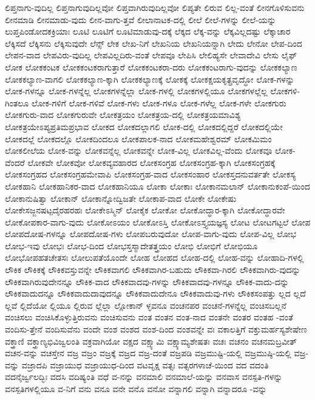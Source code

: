 {ಲಿಪ್ತನಾಗು-ವುದಿಲ್ಲ
ಲಿಪ್ತನಾಗುವುದಿಲ್ಲವೋ
ಲಿಪ್ತವಾಗಿರುವುದಿಲ್ಲವೋ
ಲಿಪ್ಯತೇ
ಲಿರುವ
ಲಿಲ್ಲ-ವಂತೆ
ಲೀನಗೊಳಿಸುವನು
ಲೀನಮಾಡಿ
ಲೀನಮಾಡು-ವುದು
ಲೀನ-ವಾಗು-ತ್ತವೆ
ಲೀಲಾನಾಟಕ-ದಲ್ಲಿ
ಲೀಲೆ
ಲೀಲೆ-ಗಳನ್ನು
ಲೀಲೆ-ಯನ್ನು
ಲುಪ್ತಪಿಂಡೋದಕಕ್ರಿಯಾಃ
ಲೂಟಿ
ಲೂಟಿಗೆ
ಲೂಟಿಮಾಡುವು-ದಕ್ಕೆ
ಲೆಕ್ಕದ
ಲೆಕ್ಕ-ವನ್ನು
ಲೆಕ್ಕವಿಲ್ಲದಷ್ಟು
ಲೆಕ್ಕಾಚಾರ
ಲೆಕ್ಕಿಸದೆ
ಲೆಕ್ಕಿಸನು
ಲೆಕ್ಕಿಸುವುದೇ
ಲೆನ್ಸ್
ಲೇಕ
ಲೇಖ-ನಿಗೆ
ಲೇಖನಿಯ
ಲೇಖನಿಯನ್ನಾಗಿ
ಲೇದು
ಲೇನೋ
ಲೇಪ-ದಿಂದ
ಲೇಪನ-ವಾದ
ಲೇಪವಿರು-ವುದಿಲ್ಲ
ಲೇಪವಿಲ್ಲದಿರು-ವಂತೆ
ಲೇಪವೂ
ಲೇಪಿಸಿ
ಲೇಲಿಹ್ಯಸೇ
ಲೇವಾದೇವಿ
ಲೇಸು
ಲೈಫ್
ಲೋಕ
ಲೋಕಕಂಟಕ
ಲೋಕಕಂಟಕರಾಗುತ್ತಾರೆ
ಲೋಕಕಂಟಕರಾ-ದರು
ಲೋಕಕಂಟರಾಗು-ವುದನ್ನು
ಲೋಕಕಲ್ಯಾಣ
ಲೋಕಕಲ್ಯಾಣ-ವಾಗಲಿ
ಲೋಕಕಲ್ಯಾಣ-ಕ್ಕಾಗಿ
ಲೋಕಕಲ್ಯಾಣಕ್ಕೆ
ಲೋಕಕ್ಕೆ
ಲೋಕಕ್ಷಯಕೃತ್ಪ್ರವೃದ್ಧೋ
ಲೋಕ-ಗಳನ್ನು
ಲೋಕ-ಗಳನ್ನೂ
ಲೋಕ-ಗಳನ್ನೆಲ್ಲ
ಲೋಕಗಳನ್ನೆಲ್ಲಾ
ಲೋಕ-ಗಳಲ್ಲಿ
ಲೋಕಗಳಲ್ಲಿಯೂ
ಲೋಕಗಳಲ್ಲೆಲ್ಲ
ಲೋಕಗಳಿ-ಗಿಂತಲೂ
ಲೋಕ-ಗಳಿಗೆ
ಲೋಕ-ಗಳಿವೆ
ಲೋಕ-ಗಳು
ಲೋಕ-ಗಳೂ
ಲೋಕ-ಗಳೆಲ್ಲ
ಲೋಕ-ಗಳೇ
ಲೋಕಗುರು
ಲೋಕಗುರು-ವಾದ
ಲೋಕಗುರುವೇ
ಲೋಕತ್ರಯಂ
ಲೋಕತ್ರಯ-ದಲ್ಲಿ
ಲೋಕತ್ರಯಮಾವಿಶ್ಯ
ಲೋಕತ್ರಯೇಽಪ್ಯಪ್ರತಿಮಪ್ರಭಾವ
ಲೋಕದ
ಲೋಕದಲ್ಲಾಗಲಿ
ಲೋಕ-ದಲ್ಲಿ
ಲೋಕದಲ್ಲಿದ್ದರೆ
ಲೋಕದಲ್ಲಿಯೇ
ಲೋಕದಲ್ಲೆ
ಲೋಕದಲ್ಲೊ
ಲೋಕದಿಂದಲೂ
ಲೋಕಪಾಲಕ-ನಾದ
ಲೋಕಮಹೇಶ್ವರಮ್
ಲೋಕಮಿಮಂ
ಲೋಕಲೀಲೆಯ
ಲೋಕ-ವನ್ನು
ಲೋಕವನ್ನೆಲ್ಲ
ಲೋಕವನ್ನೇ
ಲೋಕ-ವಿಲ್ಲ
ಲೋಕವಿಲ್ಲ-ವೆಂದು
ಲೋಕವೂ
ಲೋಕ-ವೆಂದರೆ
ಲೋಕವೇ
ಲೋಕವೋ
ಲೋಕವ್ಯವಹಾರದ
ಲೋಕಸಂಗ್ರಹ
ಲೋಕಸಂಗ್ರಹ-ಕ್ಕಾಗಿ
ಲೋಕಸಂಗ್ರಹಕ್ಕೆ
ಲೋಕಸಂಗ್ರಹದ
ಲೋಕಸಂಗ್ರಹಮೇವಾಪಿ
ಲೋಕಸಂಗ್ರಹ-ವಾದ
ಲೋಕಸಂಹಾರ
ಲೋಕಸ್ತದನುವರ್ತತೇ
ಲೋಕಸ್ಯ
ಲೋಕಹಾನಿ
ಲೋಕಹಾನಿಕರ-ವಾದ
ಲೋಕಹಾನಿಯೂ
ಲೋಕಾ
ಲೋಕಾಃ
ಲೋಕಾನಮಲಾನ್
ಲೋಕಾನುಕಂಪೆ-ಯಿಂದ
ಲೋಕಾನುಷಿತ್ವಾ
ಲೋಕಾನ್
ಲೋಕಾನ್ನೋದ್ವಿಜತೇ
ಲೋಕಾಪ-ವಾದ
ಲೋಕೇ
ಲೋಕೇಷು
ಲೋಕೇಸಜ್ಜನಷಟ್ಪದೈರಹರಹಃ
ಲೋಕೇಽಸ್ಮಿನ್
ಲೋಕೈಕ
ಲೋಕೋ
ಲೋಕೋದ್ಧಾರ-ಕ್ಕಾಗಿ
ಲೋಕೋದ್ಧಾರವೇ
ಲೋಕೋಪಕಾರ-ವಾಗು-ವುದು
ಲೋಕೋಽಯಂ
ಲೋಕೋಽಸ್ತಿ
ಲೋಕೋಽಸ್ತ್ಯಯಜ್ಞಸ್ಯ
ಲೋಟ
ಲೋಟಗಟ್ಟಲೆ
ಲೋಪ
ಲೋಪದೋಷ-ಗಳನ್ನೂ
ಲೋಪದೋಷ-ಗಳು
ಲೋಪಬರುವುದೋ
ಲೋಪ-ವಾಗು-ವುದು
ಲೋಪ-ವಿಲ್ಲ
ಲೋಭ
ಲೋಭ-ಇವು
ಲೋಭಃ
ಲೋಭ-ದಿಂದ
ಲೋಭಸ್ತಸ್ಮಾದೇತತ್ತ್ರಯಂ
ಲೋಭಿ
ಲೋಭಿಗೆ
ಲೋಭಿಯೂ
ಲೋಭೋಪಹತಚೇತಸಃ
ಲೋಲುಪತೆಯೊಂದೇ
ಲೋಹ
ಲೋಹದ
ಲೋಹ-ದಲ್ಲಿ
ಲೋಹ-ವನ್ನು
ಲೋಹಾದಿ-ಗಳಲ್ಲಿ
ಲೌಕಿಕ
ಲೌಕಿಕಕ್ಕೆ
ಲೌಕಿಕವಸ್ತುವನ್ನೇ
ಲೌಕಿಕವಾಗಲಿ
ಲೌಕಿಕವಾಗಿರ-ಬಹುದು
ಲೌಕಿಕವಾ-ಗಿರಲಿ
ಲೌಕಿಕವಾಗಿರು-ವುದನ್ನು
ಲೌಕಿಕವಾಗಿರುವುದೇನನ್ನೂ
ಲೌಕಿಕ-ವಾದ
ಲೌಕಿಕವಾದವು-ಗಳನ್ನು
ಲೌಕಿಕವಾದವು-ಗಳನ್ನೂ
ಲೌಕಿಕ-ವಾದು-ದನ್ನು
ಲೌಕಿಕವಾದುದನ್ನೂ
ಲೌಕಿಕವಾದುದಾವುದನ್ನೂ
ಲೌಕಿಕವಾದುದೇನೂ
ಲೌಕಿಕವಾದುವು-ಗಳು
ಲೌಕಿಕಸಂಪತ್ತು
ಲ್ಲದ
ಲ್ಲದೆ
ಲ್ಲವೆ
ಲ್ಲಿದೆಯೋ
ಲ್ಲಿಯೂ
ಲ್ಲಿರುವ
ಲ್ಲೆಲ್ಲಾ
ಲ್ಲೋಕಾನ್
ಳ್ಳವನೂ
ವಂಚನಪರ
ವಂಚನೆ-ಗಳನ್ನೆಲ್ಲ
ವಂಚಿಸಬಲ್ಲನೆ
ವಂಚಿಸಲು
ವಂಚಿಸಿಕೊಳ್ಳುತ್ತಿರುವನು
ವಂಚಿಸುವನು
ವಂತ
ವಂತನ
ವಂತ-ನಾದ
ವಂತನೇ
ವಂತರ
ವಂತಹ
-ವಂತೆ
ವಂದಿಸು-ತ್ತೇನೆ
ವಂದಿಸುವೆನು
ವಂದೇ
ವಂಶ
ವಂಶದ
ವಂಶ-ದಿಂದ
ವಂಶವನ್ನೇ
ವಃ
ವಕಾಲತ್ತಿಗೆ
ವಕ್ತುಮರ್ಹಸ್ಯಶೇಷೇಣ
ವಕ್ತ್ರಾಣಿ
ವಕ್ತ್ರಾಣ್ಯಭಿವಿಜ್ವಲಂತಿ
ವಕ್ರವಾಗಿಯೋ
ವಕ್ಷದ
ವಕ್ಷ್ಯಾಮಿ
ವಕ್ಷ್ಯಾಮ್ಯಶೇಷತಃ
ವಚಃ
ವಚನಂ
ವಚನಮಬ್ರವೀತ್
ವಚನ-ವನ್ನು
ವಚಸ್ತೇನ
ವಜ್ರ
ವಜ್ರಂ
ವಜ್ರಕ್ಕೆ
ವಜ್ರದ
ವಜ್ರ-ದಂತೆ
ವಜ್ರಪಡಿ
ವಜ್ರಮುಷ್ಟಿ-ಯಲ್ಲಿ
ವಜ್ರಮುಷ್ಠಿ-ಯಲ್ಲಿ
ವಜ್ರ-ವನ್ನು
ವಜ್ರಾದಪಿ
ವಜ್ರಾಯುಧ
ವಜ್ರಾಯುಧ-ದಿಂದ
ವಟವೃಕ್ಷ
ವತ್ಸಃ
ವತ್ಸರಗಳಾಚೆ-ಯಿಂದ
ವದ
ವದಂತಿ
ವದನೈರ್ಜ್ವಲದ್ಭಿಃ
ವದಸಿ
ವದಿಷ್ಯಂತಿ
ವಧೆ
ವ-ನನ್ನು
ವನಮಾಲಿ
ವನಮಾಲೆ-ಯನ್ನು
ವನವಾಸ
ವನಸ್ಪತಿ-ಗಳನ್ನು
ವನಸ್ಪತಿಗಳಲ್ಲಿಯೂ
ವ-ನಿಗೆ
ವನು
ವನೂ
ವನೇ
ವನೊ
ವನೋ
ವನ್ನಾಗಲಿ
ವನ್ನಾಗಿ
ವನ್ನಾದರೂ
-ವನ್ನು
}
